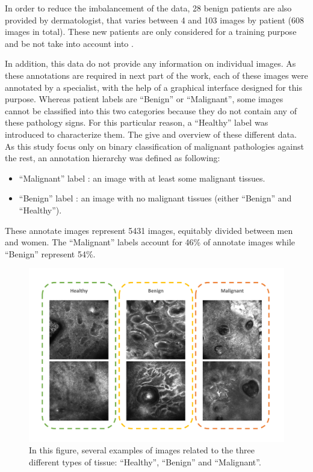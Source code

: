 \documentclass[journal,article,submit,moreauthors,pdftex, applsci]{Definitions/mdpi}
\begin{document}
In order to reduce the imbalancement of the data, 28 benign patients are also provided by dermatologist, that varies between 4 and 103 images by patient (608 images in total). These new patients are only considered for a training purpose and be not take into account into .\par
In addition, this data do not provide any information on individual images. As these annotations are required in next part of the work, each of these images were annotated by a specialist, with the help of a graphical interface designed for this purpose. Whereas patient labels are “Benign” or “Malignant”, some images cannot be classified into this two categories because they do not contain any of these pathology signs. For this particular reason, a “Healthy” label was introduced to characterize them. The  give and overview of these different data. As this study focus only on binary classification of malignant pathologies against the rest, an annotation hierarchy was defined as following:
\begin{itemize}  
\item “Malignant” label : an image with at least some malignant tissues. 
\item “Benign” label : an image with no malignant tissues (either “Benign” and “Healthy”). 
\end{itemize}
These annotate images represent 5431 images, equitably divided between men and women. The “Malignant” labels account for 46\% of annotate images while “Benign” represent 54\%.\par
\begin{figure}[h]
    \begin{center}
        \includegraphics[width=\linewidth]{Figures/Data.pdf}
        \caption{In this figure, several examples of images related to the three different types of tissue: “Healthy”, “Benign” and “Malignant”.}
        \label{fig:data}
    \end{center} 
\end{figure}\par
\end{document}

